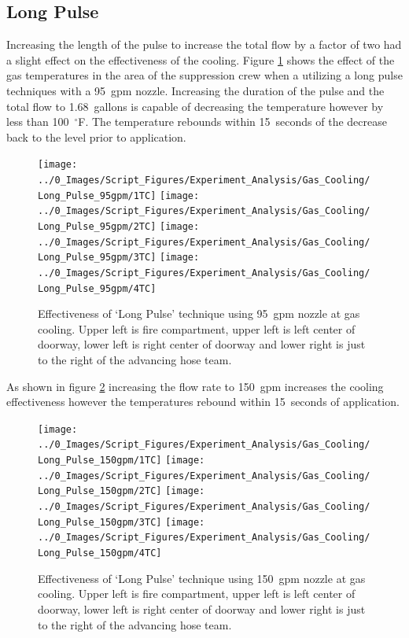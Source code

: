 \documentclass[12pt,oneside]{book}
\begin{document}
\subsection{Long Pulse}
Increasing the length of the pulse to increase the total flow by a factor of two had a slight effect on the effectiveness of the cooling. Figure \ref{fig:gas_long_pulse_95} shows the effect of the gas temperatures in the area of the suppression crew when a utilizing a long pulse techniques with a 95~gpm nozzle. Increasing the duration of the pulse and the total flow to 1.68~gallons is capable of decreasing the temperature however by less than 100~$^\circ$F. The temperature rebounds within 15~seconds of the decrease back to the level prior to application. 

\begin{figure}[H]
\centering
\texttt{[image: ../0\_Images/Script\_Figures/Experiment\_Analysis/Gas\_Cooling/Long\_Pulse\_95gpm/1TC]}
\texttt{[image: ../0\_Images/Script\_Figures/Experiment\_Analysis/Gas\_Cooling/Long\_Pulse\_95gpm/2TC]}
\texttt{[image: ../0\_Images/Script\_Figures/Experiment\_Analysis/Gas\_Cooling/Long\_Pulse\_95gpm/3TC]}
\texttt{[image: ../0\_Images/Script\_Figures/Experiment\_Analysis/Gas\_Cooling/Long\_Pulse\_95gpm/4TC]}
\caption[Gas Cooling - Long Pulse 95~gpm]{Effectiveness of `Long Pulse' technique using 95~gpm nozzle at gas cooling. Upper left is fire compartment, upper left is left center of doorway, lower left is right center of doorway and lower right is just to the right of the advancing hose team.}
\label{fig:gas_long_pulse_95}
\end{figure}

As shown in figure \ref{fig:gas_long_pulse_150} increasing the flow rate to 150~gpm increases the cooling effectiveness however the temperatures rebound within 15~seconds of application. 

\begin{figure}[H]
\centering
\texttt{[image: ../0\_Images/Script\_Figures/Experiment\_Analysis/Gas\_Cooling/Long\_Pulse\_150gpm/1TC]}
\texttt{[image: ../0\_Images/Script\_Figures/Experiment\_Analysis/Gas\_Cooling/Long\_Pulse\_150gpm/2TC]}
\texttt{[image: ../0\_Images/Script\_Figures/Experiment\_Analysis/Gas\_Cooling/Long\_Pulse\_150gpm/3TC]}
\texttt{[image: ../0\_Images/Script\_Figures/Experiment\_Analysis/Gas\_Cooling/Long\_Pulse\_150gpm/4TC]}
\caption[Gas Cooling - Long Pulse 150~gpm]{Effectiveness of `Long Pulse' technique using 150~gpm nozzle at gas cooling. Upper left is fire compartment, upper left is left center of doorway, lower left is right center of doorway and lower right is just to the right of the advancing hose team.}
\label{fig:gas_long_pulse_150}
\end{figure}
\end{document}
